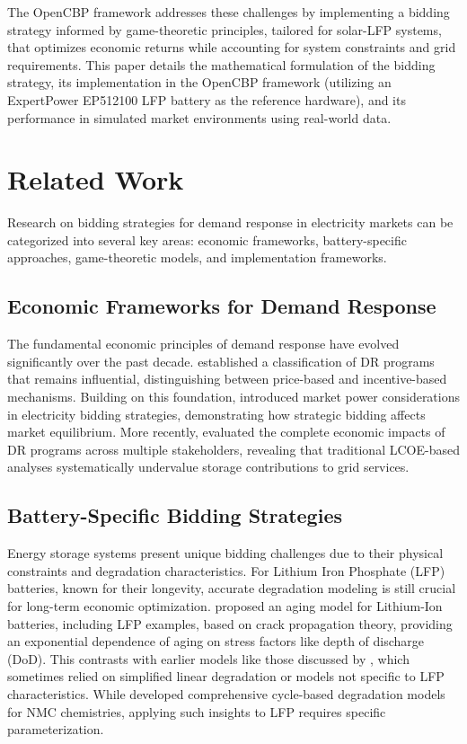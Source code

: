 \documentclass[11pt,a4paper]{article}
\begin{document}
The OpenCBP framework addresses these challenges by implementing a bidding strategy informed by game-theoretic principles, tailored for solar-LFP systems, that optimizes economic returns while accounting for system constraints and grid requirements. This paper details the mathematical formulation of the bidding strategy, its implementation in the OpenCBP framework (utilizing an ExpertPower EP512100 LFP battery as the reference hardware), and its performance in simulated market environments using real-world data.

\section{Related Work}
Research on bidding strategies for demand response in electricity markets can be categorized into several key areas: economic frameworks, battery-specific approaches, game-theoretic models, and implementation frameworks.

\subsection{Economic Frameworks for Demand Response}
The fundamental economic principles of demand response have evolved significantly over the past decade. \citet{Siano2014} established a classification of DR programs that remains influential, distinguishing between price-based and incentive-based mechanisms. Building on this foundation, \citet{Oren2001} introduced market power considerations in electricity bidding strategies, demonstrating how strategic bidding affects market equilibrium. More recently, \citet{Paterakis2017} evaluated the complete economic impacts of DR programs across multiple stakeholders, revealing that traditional LCOE-based analyses systematically undervalue storage contributions to grid services.

\subsection{Battery-Specific Bidding Strategies}
Energy storage systems present unique bidding challenges due to their physical constraints and degradation characteristics. For Lithium Iron Phosphate (LFP) batteries, known for their longevity, accurate degradation modeling is still crucial for long-term economic optimization. \citet{Millner2010} proposed an aging model for Lithium-Ion batteries, including LFP examples, based on crack propagation theory, providing an exponential dependence of aging on stress factors like depth of discharge (DoD). This contrasts with earlier models like those discussed by \citet{He2016}, which sometimes relied on simplified linear degradation or models not specific to LFP characteristics. While \citet{Xu2018} developed comprehensive cycle-based degradation models for NMC chemistries, applying such insights to LFP requires specific parameterization.
\end{document}
